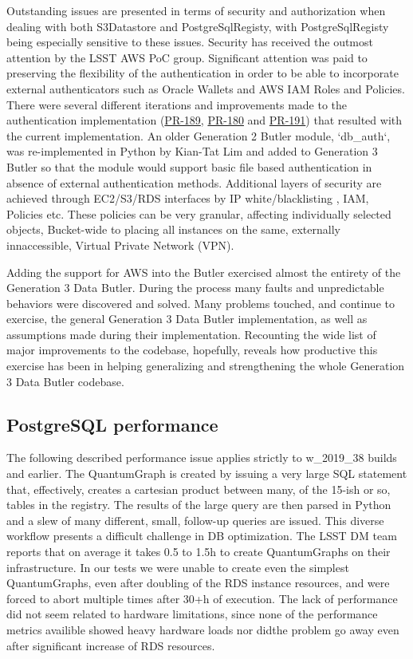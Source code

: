 Outstanding issues are presented in terms of security and authorization when dealing with both S3Datastore and PostgreSqlRegisty, with PostgreSqlRegisty being especially sensitive to these issues. Security has received the outmost attention by the LSST AWS PoC group. Significant attention was paid to preserving the flexibility of the authentication in order to be able to incorporate external authenticators such as Oracle Wallets and AWS IAM Roles and Policies. There were several different iterations and improvements made to the authentication implementation (\href{https://github.com/lsst/daf_butler/pull/189}{PR-189}, \href{https://github.com/lsst/daf_butler/pull/180}{PR-180} and \href{https://github.com/lsst/daf_butler/pull/191}{PR-191}) that resulted with the current implementation. An older Generation 2 Butler module, `db\_auth`, was re-implemented in Python by Kian-Tat Lim and added to Generation 3 Butler so that the module would support basic file based authentication in absence of external authentication methods. Additional layers of security are achieved through EC2/S3/RDS interfaces by IP white/blacklisting , IAM, Policies etc. These policies can be very granular, affecting individually selected objects, Bucket-wide to placing all instances on the same, externally innaccessible, Virtual Private Network (VPN).

Adding the support for AWS into the Butler exercised almost the entirety of the Generation 3 Data Butler. During the process many faults and unpredictable behaviors were discovered and solved. Many problems touched, and continue to exercise, the general Generation 3 Data Butler implementation, as well as assumptions made during their implementation. Recounting the wide list of major improvements to the codebase, hopefully, reveals how productive this exercise has been in helping generalizing and strengthening the whole Generation 3 Data Butler codebase.

\subsection{PostgreSQL performance}

The following described performance issue applies strictly to w\_2019\_38 builds and earlier. The QuantumGraph is created by issuing a very large SQL statement that, effectively, creates a cartesian product between many, of the 15-ish or so, tables in the registry. The results of the large query are then parsed in Python and a slew of many different, small, follow-up queries are issued. This diverse workflow presents a difficult challenge in DB optimization. The LSST DM team reports that on average it takes 0.5 to 1.5h to create QuantumGraphs on their infrastructure. In our tests we were unable to create even the simplest QuantumGraphs, even after doubling of the RDS instance resources, and were forced to abort multiple times after 30+h of execution. The lack of performance did not seem related to hardware limitations, since none of the performance metrics availible showed heavy hardware loads nor didthe problem go away even after significant increase of RDS resources. 

